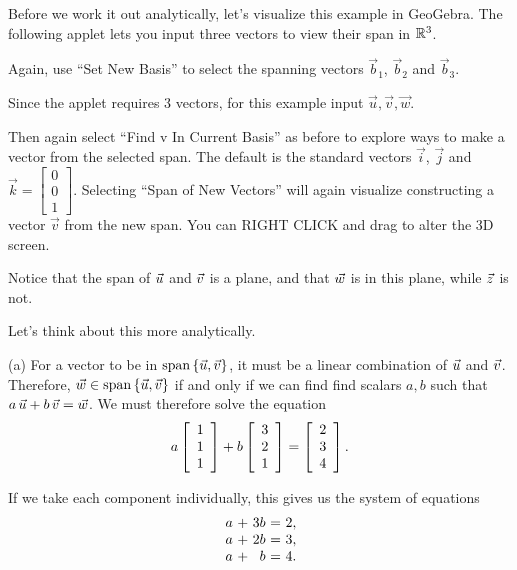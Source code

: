 \documentclass{ximera}
\begin{document}
\begin{exploration}
\begin{example}
\begin{solution}
  Before we work it out analytically, let's visualize this example in GeoGebra. The following applet lets you input three vectors to view their span in $\R^3$.

  Again, use ``Set New Basis'' to select the spanning vectors $\vec{b}_1$, $\vec{b}_2$ and $\vec{b}_3$.

  Since the applet requires 3 vectors, for this example input $\vec{u}, \vec{v}, \vec{w}$. 

  \begin{center}
  \end{center}

  Then again select ``Find v In Current Basis'' as before to explore ways to make a vector from the selected span. The default is the standard vectors $\vec{i}$, $\vec{j}$ and $\vec{k}=\begin{bmatrix}
    0\\0\\1
  \end{bmatrix}$. Selecting ``Span of New Vectors'' will again visualize constructing a vector $\vec{v}$ from the new span. You can RIGHT CLICK and drag to alter the 3D screen.

  Notice that the span of $\vect{u}$ and $\vect{v}$ is a plane, and that $\vect{w}$ is in this plane, while $\vect{z}$ is not.

\end{solution}

  \begin{solution}

    Let's think about this more analytically.

    (a) For a vector to be in $\sspan\set{\vect{u},\vect{v}}$, it must
    be a linear combination of $\vect{u}$ and $\vect{v}$. Therefore,
    $\vect{w}\in\sspan\set{\vect{u},\vect{v}}$ if and only if we can
    find find scalars $a,b$ such that
    $a\,\vect{u} + b\,\vect{v} = \vect{w}$. We must therefore solve the
    equation
    \begin{equation*}
      a \startmat{r} 1 \\ 1 \\ 1 \stopmat
      + b \startmat{r} 3 \\ 2 \\ 1 \stopmat
      = \startmat{r} 2 \\ 3 \\ 4 \stopmat.
    \end{equation*}
   
    If we take each component individually, this gives us the system of equations
    \begin{equation*}
      \begin{array}{r@{~}c@{~}r@{~}c@{~}r@{~}r}
        a & + & 3b & = & 2, \\
        a & + & 2b & = & 3, \\
        a & + & b & = & 4.
      \end{array}
    \end{equation*}


\end{solution}
\end{example}
\end{exploration}
\end{document}
